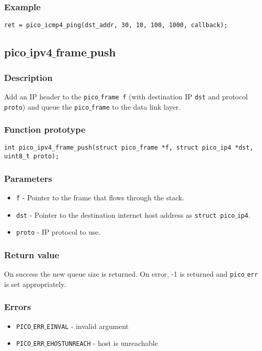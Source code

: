 \subsubsection*{Example}
\begin{verbatim}
ret = pico_icmp4_ping(dst_addr, 30, 10, 100, 1000, callback);
\end{verbatim}


\subsection{pico$\_$ipv4$\_$frame$\_$push}

\subsubsection*{Description}
Add an IP header to the \texttt{pico$\_$frame f} (with destination IP \texttt{dst} and protocol
\texttt{proto}) and queue the \texttt{pico$\_$frame} to the data link layer.

\subsubsection*{Function prototype}
\begin{verbatim}
int pico_ipv4_frame_push(struct pico_frame *f, struct pico_ip4 *dst, uint8_t proto);
\end{verbatim}

\subsubsection*{Parameters}
\begin{itemize}[noitemsep]
\item \texttt{f} - Pointer to the frame that flows through the stack.
\item \texttt{dst} - Pointer to the destination internet host address as \texttt{struct pico$\_$ip4}.
\item \texttt{proto} - IP protocol to use. 
\end{itemize}

\subsubsection*{Return value}
On success the new queue size is returned.
On error, -1 is returned and \texttt{pico$\_$err} is set appropriately.

\subsubsection*{Errors}
\begin{itemize}[noitemsep]
\item \texttt{PICO$\_$ERR$\_$EINVAL} - invalid argument
\item \texttt{PICO$\_$ERR$\_$EHOSTUNREACH} - host is unreachable
\end{itemize}

